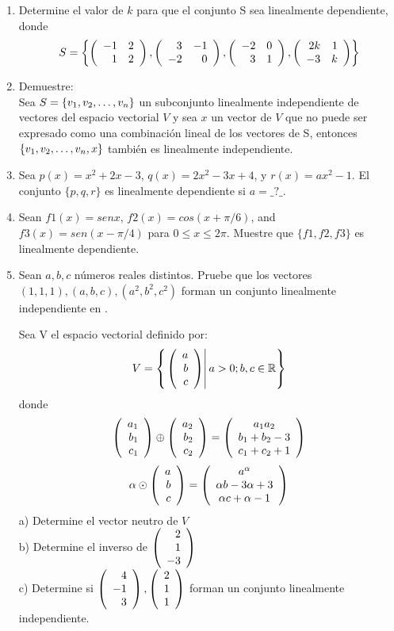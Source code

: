 \begin{enumerate}


\item
Determine el valor de $k$ para que el conjunto S sea linealmente dependiente, donde $$S=\left\{ \left( \begin{array}{rr} -1&2\\ 1&2 \end{array} \right) ,  \left( \begin{array}{rr} 3&-1\\ -2&0 \end{array} \right) ,  \left( \begin{array}{rr} -2&0\\ 3&1 \end{array} \right) , \left( \begin{array}{rr} 2k&1\\ -3&k \end{array} \right) \right\}$$

\item
Demuestre:
\\Sea $S= \lbrace v_1, v_2, \ldots, v_n \rbrace$ un subconjunto linealmente independiente de vectores del espacio vectorial $V$ y sea $x$ un vector de $V$ que no puede ser expresado como una combinaci\'on lineal de los vectores de S, entonces $ \left\{ v_1, v_2, \ldots, v_n, x \right\} $
tambi\'en es linealmente independiente.

\item
Sea $p(x)= x^2+2x-3$, $q(x)=2x^2-3x+4$, y $r(x)=ax^2-1$. El conjunto $\{p, q, r\}$ es
linealmente dependiente si $a=\_?\_$.

\item
Sean $f1(x) = sen x$, $f2(x) = cos(x+\pi/6)$, and $f3(x) = sen(x-\pi/4)$ para $0 \leq x \leq 2\pi$. Muestre que 
$\{f1, f2, f3\}$ es linealmente dependiente.


\item
Sean $a, b, c$ números reales distintos. Pruebe que los vectores $(1, 1, 1), (a, b, c), (a^2, b^2, c^2)$ forman un conjunto linealmente independiente en \rtres.



\begin{prob}[]
Sea V el espacio vectorial definido por:
\[V=\left\{ \left. \left( \begin{array}{r} a\\ b\\ c \end{array} \right) \right| a>0; b, c\in \mathbb{R} \right\}\]
donde
\[ \left( \begin{array}{r} a_1\\ b_1\\ c_1 \end{array} \right) \oplus\left( \begin{array}{r} a_2\\ b_2\\ c_2 \end{array} \right) =\left(
\begin{array}{c}
a_1a_2\\
b_1+b_2-3\\
c_1+c_2+1
\end{array}
\right)
\]
\[\alpha\odot\left( \begin{array}{r} a\\ b\\ c \end{array} \right) =\left(
\begin{array}{c}
a^\alpha\\
\alpha b-3\alpha+3\\
\alpha c+\alpha-1
\end{array}
\right)\]
a) Determine el vector neutro de $V$
~\\b) Determine el inverso de $\left( \begin{array}{r} 2\\ 1\\ -3 \end{array} \right) $
~\\c) Determine si $\left( \begin{array}{r} 4\\ -1\\ 3 \end{array} \right) , \left( \begin{array}{r} 2\\ 1\\ 1 \end{array} \right) $ forman un conjunto linealmente independiente.


\end{prob}
\end{enumerate}
